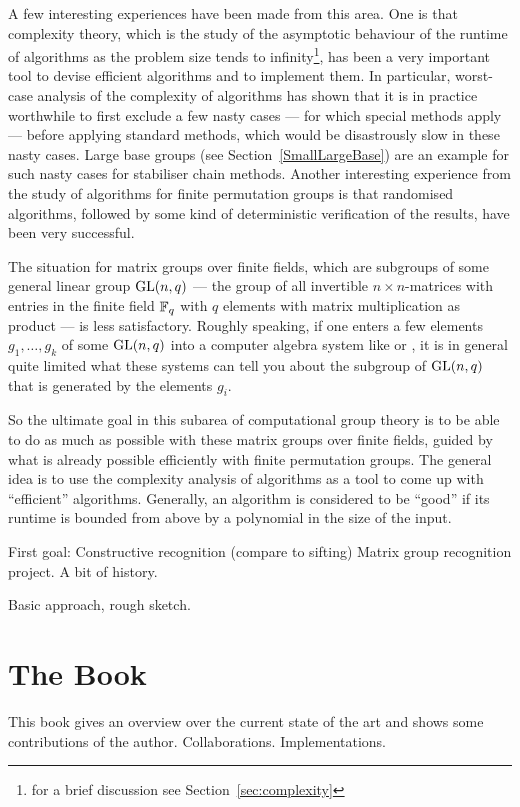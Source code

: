 A few interesting experiences have been made from this area. One is that 
complexity theory,
which is the study of the asymptotic behaviour of the runtime of algorithms 
as the problem size tends to infinity\footnote{for a brief discussion see 
Section~\ref{sec:complexity}}, has been a very important tool to
devise efficient algorithms and to implement them. In particular,
worst-case analysis of the complexity of algorithms has shown that
it is in practice worthwhile to first exclude a few nasty cases ---
for which special methods apply --- before applying standard methods,
which would be disastrously slow in these nasty cases. Large base
groups (see Section~\ref{SmallLargeBase}) are an example for such
nasty cases for stabiliser chain methods.
Another interesting
experience from the study of algorithms for finite permutation groups 
is that randomised algorithms, followed by some kind of
deterministic verification of the results, have been very successful.

The situation for matrix groups over finite fields, which are subgroups 
of some general linear group $\GL(n,q)$ --- the group of all
invertible $n \times n$-matrices with entries in the finite field
$\mathbb{F}_q$ with $q$ elements with matrix multiplication as product ---
is less satisfactory. Roughly speaking, if one enters a few
elements $g_1, \ldots, g_k$ of some $\GL(n,q)$ into a computer algebra 
system like {\GAP} or {\MAGMA}, it is in general quite limited what
these systems can tell you about the subgroup of $\GL(n,q)$ that is
generated by the elements $g_i$.

So the ultimate goal in this subarea of computational group theory
is to be able to do as much as possible with these matrix groups over
finite fields, guided by what is already possible efficiently with
finite permutation groups. The general idea is to use the complexity
analysis of algorithms as a tool to come up with ``efficient''
algorithms. Generally, an algorithm is considered to be ``good'' if
its runtime is bounded from above by a polynomial in the size of the
input.

First goal: Constructive recognition (compare to sifting)
Matrix group recognition project. A bit of history.

Basic approach, rough sketch.

\section{The Book}

This book gives an overview over the current state of the art and
shows some contributions of the author. Collaborations.
Implementations.

